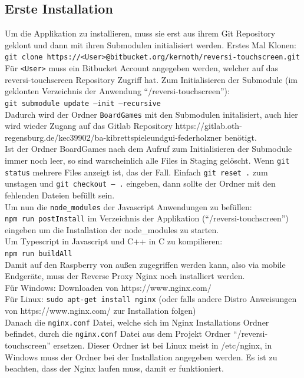 \documentclass[12pt,a4paper,bibliography=totocnumbered,listof=totocnumbered]{article}
\begin{document}
\begin{appendix}
\section{Erste Installation}
\label{apx:Installation}
Um die Applikation zu installieren, muss sie erst aus ihrem Git Repository geklont und dann mit ihren Submodulen initialisiert werden.
Erstes Mal Klonen: \\ 
\texttt{git clone https://<User>@bitbucket.org/kernoth/reversi-touchscreen.git} \\
Für \texttt{<User>} muss ein Bitbucket Account angegeben werden, welcher auf das reversi-touchscreen Repository Zugriff hat.
Zum Initialisieren der Submodule (im geklonten Verzeichnis der Anwendung ``/reversi-touchscreen''): \\
\texttt{git submodule update --init --recursive} \\
Dadurch wird der Ordner \texttt{BoardGames} mit den Submodulen initalisiert, auch hier wird wieder Zugang auf das Gitlab Repository
https://gitlab.oth-regensburg.de/kec39902/ba-kibrettspieleundgui-federholzner benötigt. \\
Ist der Ordner BoardGames nach dem Aufruf zum Initialisieren der Submodule immer noch leer, so sind warscheinlich alle Files in Staging gelöscht.
Wenn \texttt{git status} mehrere Files anzeigt ist, das der Fall. Einfach \texttt{git reset .} zum unstagen und \texttt{git checkout -- .} 
eingeben, dann sollte der Ordner mit den fehlenden Dateien befüllt sein. \\ 
Um nun die \texttt{node\_modules} der Javascript Anwendungen zu befüllen: \\
\texttt{npm run postInstall} im Verzeichnis der Applikation (``/reversi-touchscreen'') eingeben um die Installation der node\_modules zu starten. \\
Um Typescript in Javascript und C++ in C zu kompilieren: \\
\texttt{npm run buildAll} \\
Damit auf den Raspberry von außen zugegriffen werden kann, also via mobile Endgeräte, muss der Reverse Proxy Nginx noch installiert werden. \\
Für Windows: Downloaden von https://www.nginx.com/ \\
Für Linux: \texttt{sudo apt-get install nginx} (oder falls andere Distro Anweisungen von https://www.nginx.com/ zur Installation folgen)\\
Danach die \texttt{nginx.conf} Datei, welche sich im Nginx Installations Ordner befindet, durch die \texttt{nginx.conf} Datei aus dem Projekt Ordner
``/reversi-touchscreen'' ersetzen. Dieser Ordner ist bei Linux meist in /etc/nginx, in Windows muss der Ordner bei der Installation angegeben werden.
Es ist zu beachten, dass der Nginx laufen muss, damit er funktioniert.


\end{appendix}
\end{document}

